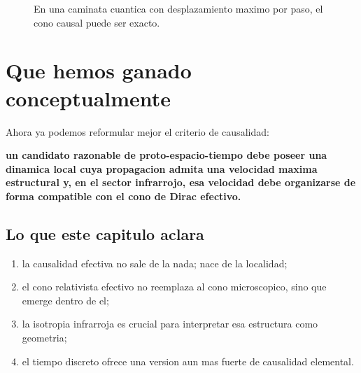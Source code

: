 \begin{figure}[h!]
\centering
{}
\caption{En una caminata cuantica con desplazamiento maximo por paso, el cono causal puede ser exacto.}
\end{figure}

\section{Que hemos ganado conceptualmente}
Ahora ya podemos reformular mejor el criterio de causalidad:
\begin{displayquote}
\textbf{un candidato razonable de proto-espacio-tiempo debe poseer una dinamica local cuya propagacion admita una velocidad maxima estructural y, en el sector infrarrojo, esa velocidad debe organizarse de forma compatible con el cono de Dirac efectivo.}
\end{displayquote}

\subsection{Lo que este capitulo aclara}
\begin{enumerate}[label=\arabic*.]
    \item la causalidad efectiva no sale de la nada; nace de la localidad;
    \item el cono relativista efectivo no reemplaza al cono microscopico, sino que emerge dentro de el;
    \item la isotropia infrarroja es crucial para interpretar esa estructura como geometria;
    \item el tiempo discreto ofrece una version aun mas fuerte de causalidad elemental.
\end{enumerate}

